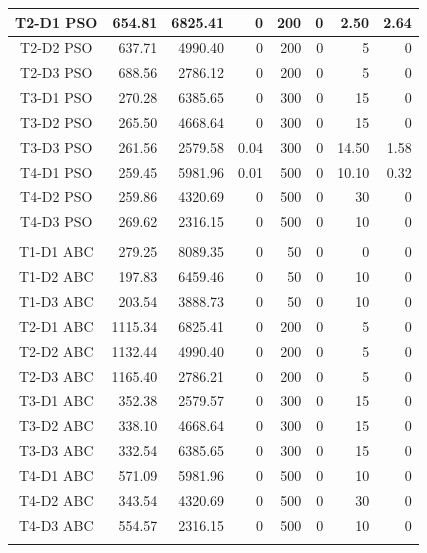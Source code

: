 \documentclass[a4paper,slovak,12pt,appendix]{article}
\begin{document}
\begin{appendices}
\begin{table}[!ht]
\begin{tabular}{|c|r|r|r|r|r|r|r|}
		T2-D1 PSO		&		654.81	&		6825.41		&		0	&		200		&		0		&		2.50		&		2.64 	\\ \hline
		T2-D2 PSO		&		637.71	&		4990.40		&		0	&		200		&		0		&		5				&		0 	 	\\ \hline
		T2-D3 PSO		&		688.56	&		2786.12		&		0	&		200		&		0		&		5				&		0 	 	\\ \hline

		T3-D1 PSO		&		270.28	&		6385.65		&		0			&		300		&		0		&		15			&		0 	 	\\ \hline
		T3-D2 PSO		&		265.50	&		4668.64		&		0			&		300		&		0		&		15			&		0 	 	\\ \hline
		T3-D3 PSO		&		261.56	&		2579.58		&		0.04	&		300		&		0		&		14.50		&		1.58 	\\ \hline

		T4-D1 PSO		&		259.45	&		5981.96		&		0.01	&		500		&		0			&		10.10		&		0.32 	 	\\ \hline
		T4-D2 PSO		&		259.86	&		4320.69		&		0			&		500		&		0			&		30			&		0 	 		\\ \hline
		T4-D3 PSO		&		269.62	&		2316.15		&		0			&		500		&		0			&		10			&		0				\\ \hline
		\multicolumn{8}{|c|}{}	\\ \hline

		T1-D1 ABC		&		279.25		&		8089.35		&		0		&		50		&		0		&		0			&		0 	 \\ \hline
		T1-D2 ABC		&		197.83		&		6459.46		&		0		&		50		&		0		&		10		&		0 	 \\ \hline
		T1-D3 ABC		&		203.54		&		3888.73		&		0		&		50		&		0		&		10		&		0 	 \\ \hline

		T2-D1 ABC		&		1115.34		&		6825.41		&		0		&		200		&		0		&		5			&		0 	 \\ \hline
		T2-D2 ABC		&		1132.44		&		4990.40		&		0		&		200		&		0		&		5			&		0 	 \\ \hline
		T2-D3 ABC		&		1165.40		&		2786.21		&		0		&		200		&		0		&		5			&		0 	 \\ \hline

		T3-D1 ABC		&		352.38		&		2579.57		&		0		&		300		&		0		&		15		&		0 	 \\ \hline
		T3-D2 ABC		&		338.10		&		4668.64		&		0		&		300		&		0		&		15		&		0 	 \\ \hline
		T3-D3 ABC		&		332.54		&		6385.65		&		0		&		300		&		0		&		15		&		0 	 \\ \hline

		T4-D1 ABC		&		571.09		&		5981.96		&		0		&		500		&		0		&		10		&		0 	 \\ \hline
		T4-D2 ABC		&		343.54		&		4320.69		&		0		&		500		&		0		&		30		&		0 	 \\ \hline
		T4-D3 ABC		&		554.57		&		2316.15		&		0		&		500		&		0		&		10		&		0 	 \\ \hline
		\multicolumn{8}{|c|}{}	\\ \hline


\end{tabular}
\end{table}
\end{appendices}
\end{document}
